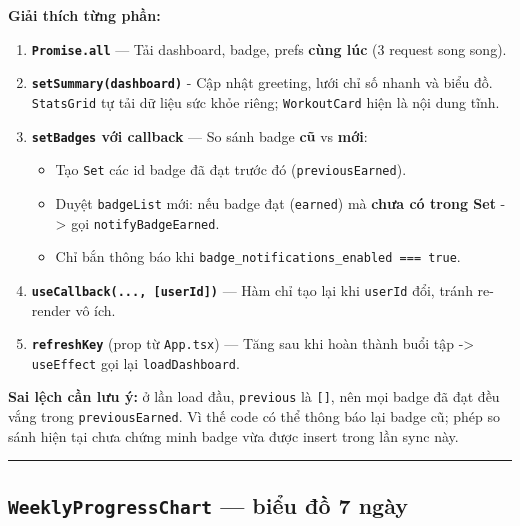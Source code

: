 \documentclass[12pt,a4paper]{article}
\providecommand{\tightlist}{%
  \setlength{\itemsep}{0pt}\setlength{\parskip}{0pt}}
\begin{document}
\textbf{Giải thích từng phần:}

\begin{enumerate}
\def\labelenumi{\arabic{enumi}.}
\tightlist
\item
  \textbf{\texttt{Promise.all}} --- Tải dashboard, badge, prefs
  \textbf{cùng lúc} (3 request song song).
\item
  \textbf{\texttt{setSummary(dashboard)}} - Cập nhật greeting, lưới chỉ
  số nhanh và biểu đồ. \texttt{StatsGrid} tự tải dữ liệu sức khỏe riêng;
  \texttt{WorkoutCard} hiện là nội dung tĩnh.
\item
  \textbf{\texttt{setBadges} với callback} --- So sánh badge \textbf{cũ}
  vs \textbf{mới}:

  \begin{itemize}
  \tightlist
  \item
    Tạo \texttt{Set} các id badge đã đạt trước đó
    (\texttt{previousEarned}).
  \item
    Duyệt \texttt{badgeList} mới: nếu badge đạt (\texttt{earned}) mà
    \textbf{chưa có trong Set} -\textgreater{} gọi
    \texttt{notifyBadgeEarned}.
  \item
    Chỉ bắn thông báo khi
    \texttt{badge\_notifications\_enabled\ ===\ true}.
  \end{itemize}
\item
  \textbf{\texttt{useCallback(...,\ {[}userId{]})}} --- Hàm chỉ tạo lại
  khi \texttt{userId} đổi, tránh re-render vô ích.
\item
  \textbf{\texttt{refreshKey}} (prop từ \texttt{App.tsx}) --- Tăng sau
  khi hoàn thành buổi tập -\textgreater{} \texttt{useEffect} gọi lại
  \texttt{loadDashboard}.
\end{enumerate}

\textbf{Sai lệch cần lưu ý:} ở lần load đầu, \texttt{previous} là
\texttt{{[}{]}}, nên mọi badge đã đạt đều vắng trong
\texttt{previousEarned}. Vì thế code có thể thông báo lại badge cũ; phép
so sánh hiện tại chưa chứng minh badge vừa được insert trong lần sync
này.

\begin{center}\rule{0.5\linewidth}{0.5pt}\end{center}

\subsection{\texorpdfstring{\texttt{WeeklyProgressChart} --- biểu đồ 7
ngày}{WeeklyProgressChart --- biểu đồ 7 ngày}}\label{weeklyprogresschart-biux1ec3u-ux111ux1ed3-7-nguxe0y}
\end{document}
